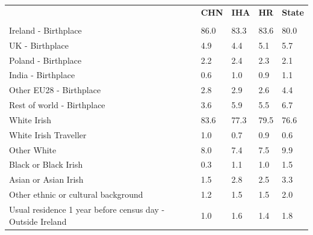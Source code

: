 \documentclass{article}
\begin{document}
\pagebreak
\begin{table}[h]	
\centering
		\begin{tabular}{KTTTT}
  \hline
& \textbf{CHN} & \textbf{IHA} & \textbf{HR}& \textbf{State}\\ 
  \hline
    \\ 
    \hline
Ireland - Birthplace & 86.0& 83.3& 83.6& 80.0\\
UK - Birthplace & 4.9& 4.4& 5.1& 5.7\\
Poland - Birthplace & 2.2& 2.4& 2.3& 2.1\\
India - Birthplace & 0.6& 1.0& 0.9& 1.1\\
Other EU28 - Birthplace & 2.8& 2.9& 2.6& 4.4\\
Rest of world - Birthplace & 3.6& 5.9& 5.5& 6.7\\
    \hline
White Irish & 83.6& 77.3& 79.5& 76.6\\
White Irish Traveller & 1.0& 0.7& 0.9& 0.6\\
Other White & 8.0& 7.4& 7.5& 9.9\\
Black or Black Irish & 0.3& 1.1& 1.0& 1.5\\
Asian or Asian Irish & 1.5& 2.8& 2.5& 3.3\\
Other ethnic or cultural background & 1.2& 1.5& 1.5& 2.0\\
    \hline
Usual residence 1 year before census day - Outside Ireland & 1.0& 1.6& 1.4& 1.8\\


\end{tabular}
\end{table}
\end{document}
